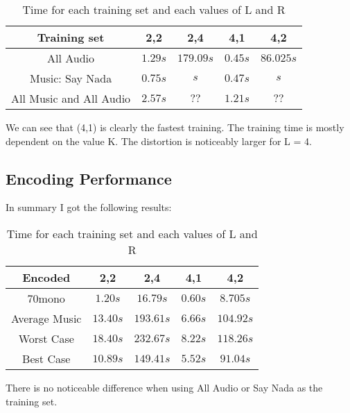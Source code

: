 \documentclass[a4paper, 11pt]{article}
\begin{document}
			\begin{table}[H]
				\centering
				\begin{tabular}{c|c|c|c|c}
					\textbf{Training set}	 	& \textbf{2,2} & \textbf{2,4}	& \textbf{4,1} & \textbf{4,2}\\ \hline
					All Audio 					& $ 1.29 s $ 	& $ 179.09 s $	& $ 0.45 s $ 	& $ 86.02 5 s $	\\ \hline
					Music: Say Nada				& $ 0.75 s $	& $  s $	& $ 0.47 s $ 	& $  s $	\\ \hline
					All Music and All Audio 	& $ 2.57 s $	& $	?? $		& $ 1.21 s $	& $	?? $		\\
				\end{tabular}
				\caption{Time for each training set and each values of L and R}
				\label{table:TrainTime}
			\end{table}
		
			We can see that (4,1) is clearly the fastest training.
			The training time is mostly dependent on the value K.
			The distortion is noticeably larger for L = 4.
			
		\subsection{Encoding Performance}
			In summary I got the following results:
			
			\begin{table}[H]
				\centering
				\begin{tabular}{c|c|c|c|c}
					\textbf{Encoded}	& \textbf{2,2} 	& \textbf{2,4}	& \textbf{4,1} & \textbf{4,2}\\ \hline
					70mono					& $ 1.20 s $ 	& $ 16.79 s $	& $ 0.60 s $ 	& $ 8.70 5 s $	\\ \hline
					Average Music			& $ 13.40 s $	& $ 193.61 s $	& $ 6.66 s $ 	& $ 104.92 s $	\\ \hline	
					Worst Case				& $ 18.40 s $	& $	232.67 s $	& $ 8.22 s $	& $	118.26 s $	\\ \hline
					Best Case				& $ 10.89 s $	& $	149.41 s $	& $ 5.52 s $	& $	91.04 s $	\\
				\end{tabular}
				\caption{Time for each training set and each values of L and R}
				\label{table:EncodeTime}
			\end{table}
			There is no noticeable difference when using All Audio or Say Nada as the training set.
			
\end{document}
